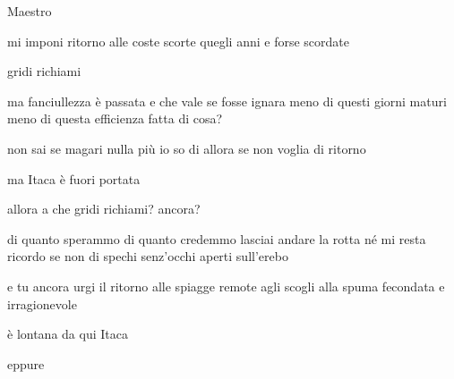\begin{volumetitlepage}

	\bigskip\bigskip\bigskip
\end{volumetitlepage}


\begin{poem}
	\begin{stanza}
		Maestro
	\end{stanza}

	\begin{stanza}
		mi imponi ritorno\verseline
		alle coste scorte quegli anni e forse\verseline
		scordate
	\end{stanza}

	\begin{stanza}
		gridi richiami
	\end{stanza}

	\begin{stanza}
		ma fanciullezza è passata\verseline
		e che vale se fosse ignara\verseline
		meno di questi giorni maturi\verseline
		meno di questa efficienza\verseline
		fatta di cosa?
	\end{stanza}

	\begin{stanza}
		non sai se magari nulla più io so\verseline
		di allora\verseline
		se non voglia di ritorno
	\end{stanza}

	\begin{stanza}
		ma Itaca è fuori portata
	\end{stanza}

	\begin{stanza}
		allora a che gridi richiami? ancora?
	\end{stanza}

	\begin{stanza}
		di quanto sperammo\verseline
		di quanto credemmo\verseline
		lasciai andare la rotta\verseline
		né mi resta ricordo\verseline
		se non di spechi senz’occhi\verseline
		aperti sull’erebo
	\end{stanza}

	\begin{stanza}
		e tu ancora\verseline
		urgi il ritorno\verseline
		alle spiagge remote\verseline
		agli scogli\verseline
		alla spuma fecondata\verseline
		e irragionevole
	\end{stanza}

	\begin{stanza}
		è lontana da qui Itaca
	\end{stanza}

	\begin{stanza}
		eppure
	\end{stanza}
\end{poem}

